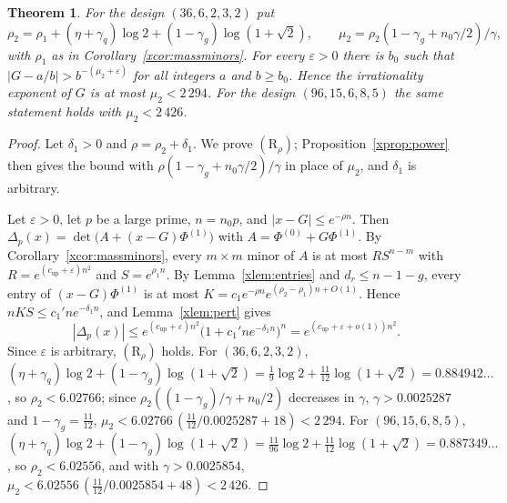 \documentclass[11pt]{article}
\newtheorem{theorem}{Theorem}
\theoremstyle{definition}
\begin{document}
\begin{theorem}\label{xthm:exponent}
For the design $(36,6,2,3,2)$ put
\[
\rho_2=\rho_1+(\eta+\gamma_q)\log2+(1-\gamma_g)\log(1+\sqrt2),\qquad \mu_2=\rho_2(1-\gamma_g+n_0\gamma/2)/\gamma ,
\]
with $\rho_1$ as in Corollary~\ref{xcor:massminors}. For every $\varepsilon>0$ there is $b_0$ such that $|G-a/b|>b^{-(\mu_2+\varepsilon)}$ for all integers $a$ and $b\ge b_0$. Hence the irrationality exponent of $G$ is at most $\mu_2<2\,294$. For the design $(96,15,6,8,5)$ the same statement holds with $\mu_2<2\,426$.
\end{theorem}

\begin{proof}
Let $\delta_1>0$ and $\rho=\rho_2+\delta_1$. We prove $(\mathrm R_\rho)$; Proposition~\ref{xprop:power} then gives the bound with $\rho(1-\gamma_g+n_0\gamma/2)/\gamma$ in place of $\mu_2$, and $\delta_1$ is arbitrary.

Let $\varepsilon>0$, let $p$ be a large prime, $n=n_0p$, and $|x-G|\le e^{-\rho n}$. Then $\Delta_p(x)=\det\big(A+(x-G)\Phi^{(1)}\big)$ with $A=\Phi^{(0)}+G\Phi^{(1)}$. By Corollary~\ref{xcor:massminors}, every $m\times m$ minor of $A$ is at most $RS^{n-m}$ with $R=e^{(c_{\mathrm{up}}+\varepsilon)n^2}$ and $S=e^{\rho_1n}$. By Lemma~\ref{xlem:entries} and $d_r\le n-1-g$, every entry of $(x-G)\Phi^{(1)}$ is at most $K=c_1e^{-\rho n}e^{(\rho_2-\rho_1)n+O(1)}$. Hence $nKS\le c_1'ne^{-\delta_1n}$, and Lemma~\ref{xlem:pert} gives
\[
|\Delta_p(x)|\le e^{(c_{\mathrm{up}}+\varepsilon)n^2}\big(1+c_1'ne^{-\delta_1n}\big)^n=e^{(c_{\mathrm{up}}+\varepsilon+o(1))n^2}.
\]
Since $\varepsilon$ is arbitrary, $(\mathrm R_\rho)$ holds. For $(36,6,2,3,2)$, $(\eta+\gamma_q)\log2+(1-\gamma_g)\log(1+\sqrt2)=\frac19\log2+\frac{11}{12}\log(1+\sqrt2)=0.884942\ldots$, so $\rho_2<6.02766$; since $\rho_2((1-\gamma_g)/\gamma+n_0/2)$ decreases in $\gamma$, $\gamma>0.0025287$ and $1-\gamma_g=\frac{11}{12}$, $\mu_2<6.02766\,(\tfrac{11}{12}/0.0025287+18)<2\,294$. For $(96,15,6,8,5)$, $(\eta+\gamma_q)\log2+(1-\gamma_g)\log(1+\sqrt2)=\frac{11}{96}\log2+\frac{11}{12}\log(1+\sqrt2)=0.887349\ldots$, so $\rho_2<6.02556$, and with $\gamma>0.0025854$, $\mu_2<6.02556\,(\tfrac{11}{12}/0.0025854+48)<2\,426$.
\end{proof}
\end{document}
